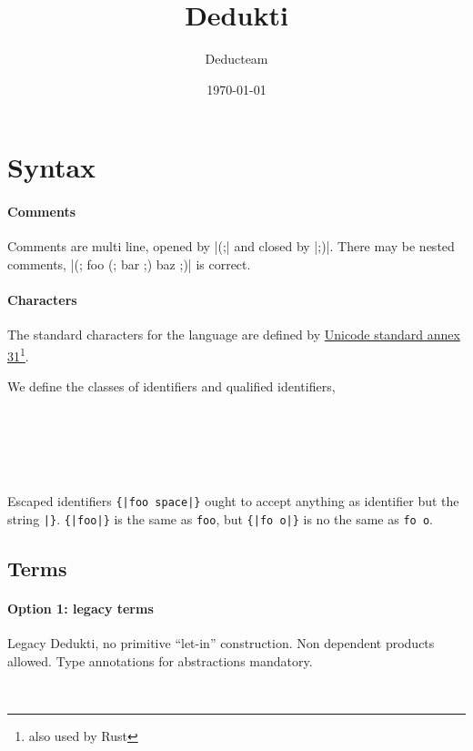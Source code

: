 \documentclass{article}
\author{Deducteam}
\title{Dedukti}
\date{\today}
\begin{document}
\maketitle

\section{Syntax}

\paragraph{Comments}

\DefineShortVerb{\|}
Comments are multi line, opened by |(;| and closed by |;)|. There may be nested comments,
|(; foo (; bar ;) baz ;)| is correct.
\UndefineShortVerb{\|}

\paragraph{Characters}

The standard characters for the language are defined by
\href{https://www.unicode.org/reports/tr31/tr31-33.html}{Unicode standard annex 31}\footnote{also used by Rust}.

We define the classes of identifiers and qualified identifiers,

\begin{bnf*}
	\\
	\\
	\\
	\\
\end{bnf*}

Escaped identifiers \verb+{|foo space|}+ ought to accept anything as identifier but the string
\verb+|}+. \verb+{|foo|}+ is the same as \verb+foo+, but \verb+{|fo o|}+ is no the same as \verb+fo o+.

\subsection{Terms}

\paragraph{Option 1: legacy terms}

Legacy Dedukti, no primitive ``let-in'' construction. Non dependent products allowed.
Type annotations for abstractions mandatory.
\begin{bnf*}
	\\
\end{bnf*}
\end{document}
